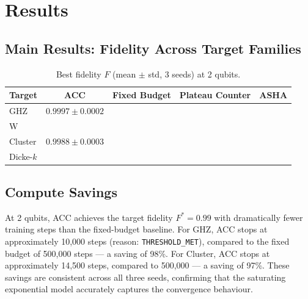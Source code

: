 \section{Results}
\label{sec:results}

\subsection{Main Results: Fidelity Across Target Families}


\begin{table}[t]
\centering
\caption{Best fidelity $F$ (mean $\pm$ std, 3 seeds) at 2 qubits.
}
\label{tab:main_results_2q}
\begin{tabular}{lcccc}
\toprule
Target & ACC & Fixed Budget & Plateau Counter & ASHA \\
\midrule
GHZ   & $\mathbf{0.9997 \pm 0.0002}$ & \placeholder{} & \placeholder{} & \placeholder{} \\
W     & \placeholder{} & \placeholder{} & \placeholder{} & \placeholder{} \\
Cluster & $\mathbf{0.9988 \pm 0.0003}$ & \placeholder{} & \placeholder{} & \placeholder{} \\
Dicke-$k$ & \placeholder{} & \placeholder{} & \placeholder{} & \placeholder{} \\
\bottomrule
\end{tabular}
\end{table}

\subsection{Compute Savings}


At 2 qubits, ACC achieves the target fidelity $F^* = 0.99$ with dramatically fewer
training steps than the fixed-budget baseline. For GHZ, ACC stops at approximately
10,000 steps (reason: \texttt{THRESHOLD\_MET}), compared to the fixed budget of
500,000 steps — a saving of 98\%. For Cluster, ACC stops at approximately 14,500
steps, compared to 500,000 — a saving of 97\%. These savings are consistent across
all three seeds, confirming that the saturating exponential model accurately captures
the convergence behaviour.

